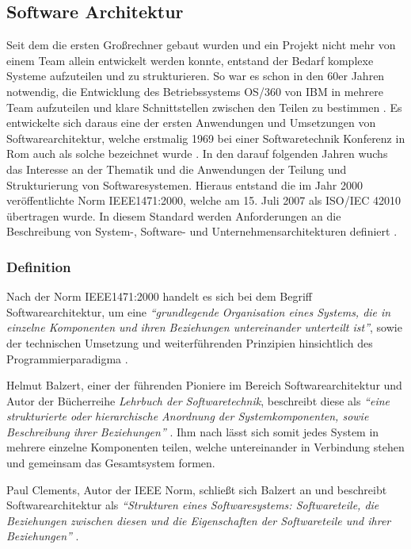 \subsection{Software Architektur}

Seit dem die ersten Großrechner gebaut wurden und ein Projekt nicht mehr von einem Team allein entwickelt werden konnte, entstand der Bedarf komplexe Systeme aufzuteilen und zu strukturieren. So war es schon in den 60er Jahren notwendig, die Entwicklung des  Betriebssystems OS/360 von IBM in mehrere Team aufzuteilen und klare Schnittstellen zwischen den Teilen zu bestimmen \parencite{brooks_mythical_1995}. Es entwickelte sich daraus eine der ersten Anwendungen und Umsetzungen von  Softwarearchitektur, welche erstmalig 1969 bei einer Softwaretechnik Konferenz in Rom auch als solche bezeichnet wurde \parencite[vgl.][S. 12]{buxton_software_1970}. In den darauf folgenden Jahren wuchs das Interesse an der Thematik und die Anwendungen der Teilung und Strukturierung von Softwaresystemen.
Hieraus entstand die im Jahr 2000 veröffentlichte Norm IEEE1471:2000, welche am 15. Juli 2007 als  ISO/IEC  42010 übertragen wurde. In diesem Standard werden Anforderungen an die Beschreibung von System-, Software- und Unternehmensarchitekturen definiert \parencite{hilliard_isoiecieee_nodate}.

\subsubsection{Definition}

Nach der Norm IEEE1471:2000 handelt es sich bei dem Begriff Softwarearchitektur, um eine  \textit{\enquote{grundlegende Organisation eines Systems, die in einzelne Komponenten und ihren Beziehungen untereinander unterteilt ist}}, sowie der technischen Umsetzung und weiterführenden Prinzipien hinsichtlich des Programmierparadigma \parencite[S. 12]{clements_comparing_2005}.

Helmut Balzert, einer der führenden Pioniere im Bereich Softwarearchitektur und Autor der Bücherreihe \textit{Lehrbuch der Softwaretechnik}, beschreibt diese als \textit{\enquote{eine strukturierte oder hierarchische Anordnung der Systemkomponenten, sowie Beschreibung ihrer Beziehungen}} \parencite[][S. 580]{balzert_lehrbuch_2011}. Ihm nach lässt sich somit jedes System in mehrere einzelne Komponenten teilen, welche untereinander in Verbindung stehen und gemeinsam das Gesamtsystem formen.

Paul Clements, Autor der IEEE Norm, schließt sich Balzert an und beschreibt Softwarearchitektur als \textit{\enquote{Strukturen eines Softwaresystems: Softwareteile, die Beziehungen zwischen diesen und die Eigenschaften der Softwareteile und ihrer Beziehungen}} \parencite[][S. 23]{clements_documenting_2010}.


